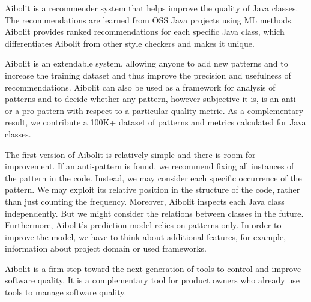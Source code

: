 
Aibolit is a recommender system that helps improve the quality of Java classes.
The recommendations are learned from OSS Java projects using ML methods.
Aibolit provides ranked recommendations for each specific Java class,
which differentiates Aibolit from other style checkers and makes it unique.

Aibolit is an extendable system, allowing anyone to add new patterns and to
increase the training dataset and thus improve the precision and usefulness
of recommendations. Aibolit can also be used as a framework for analysis of
patterns and to decide whether any pattern, however subjective it is, is an anti- or a pro-pattern
with respect to a particular quality metric. As a complementary result,
we contribute a 100K+ dataset of patterns and metrics calculated for Java classes.

The first version of Aibolit is relatively simple and there is room
for improvement. If an anti-pattern is found, we recommend fixing all instances
of the pattern in the code. Instead, we may consider each specific occurrence of the pattern.
We may exploit its relative position in the structure of the code, rather than just counting
the frequency. Moreover, Aibolit inspects each Java class independently. But
we might consider the relations between classes in the future. Furthermore,
Aibolit's prediction model relies on patterns only. In order to improve the model,
we have to think about additional features, for example, information about
project domain or used frameworks.

Aibolit is a firm step toward the next generation of tools to control
and improve software quality. It is a complementary tool for
product owners who already use tools to manage software quality.
